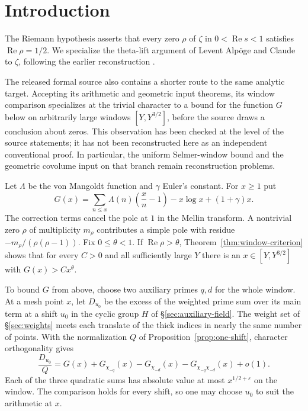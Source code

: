 \section{Introduction}\label{sec:intro}

The Riemann hypothesis asserts that every zero $\rho$ of $\zeta$ in
$0<\operatorname{Re}s<1$ satisfies $\operatorname{Re}\rho=1/2$.
We specialize the theta-lift argument of Levent Alp\"oge and Claude
to $\zeta$, following the earlier reconstruction
\citep{alpoge-archive,adriazola-grh}.

The released formal source also contains a shorter route to the same
analytic target. Accepting its arithmetic and geometric input theorems,
its window comparison specializes at the trivial character to a bound
for the function $G$ below on arbitrarily large windows
$[Y,Y^{3/2}]$, before the source draws a conclusion about zeros. This
observation has been checked at the level of the source statements; it
has not been reconstructed here as an independent conventional proof.
In particular, the uniform Selmer-window bound and the geometric
covolume input on that branch remain reconstruction problems.

Let $\Lambda$ be the von Mangoldt function and $\gamma$ Euler's constant.
For $x\ge1$ put
\[
 G(x)=\sum_{n\le x}\Lambda(n)\left(\frac{x}{n}-1\right)
                  -x\log x+(1+\gamma)x .
\]
The correction terms cancel the pole at $1$ in the Mellin transform.
A nontrivial zero $\rho$ of multiplicity $m_\rho$ contributes a simple
pole with residue $-m_\rho/(\rho(\rho-1))$. Fix $0\le\theta<1$.
If $\operatorname{Re}\rho>\theta$, Theorem~\ref{thm:window-criterion}
shows that for every $C>0$ and all sufficiently large $Y$ there is
an $x\in[Y,Y^{3/2}]$ with $G(x)>Cx^\theta$.

To bound $G$ from above, choose two auxiliary primes $q,d$ for the
whole window. At a mesh point $x$, let $D_{u_0}$ be the excess of the
weighted prime sum over its main term at a shift $u_0$ in the cyclic
group $H$ of \S\ref{sec:auxiliary-field}. The weight set of
\S\ref{sec:weights} meets each translate of the thick indices in nearly
the same number of points. With the normalization $Q$ of
Proposition~\ref{prop:one-shift}, character orthogonality gives
\[
 \frac{D_{u_0}}{Q}
   =G(x)+G_{\chi_{-q}}(x)-G_{\chi_{-d}}(x)
             -G_{\chi_{-q}\chi_{-d}}(x)+o(1).
\]
Each of the three quadratic sums has absolute value at most
$x^{1/2+\varepsilon}$ on the window. The comparison holds for every
shift, so one may choose $u_0$ to suit the arithmetic at $x$.

